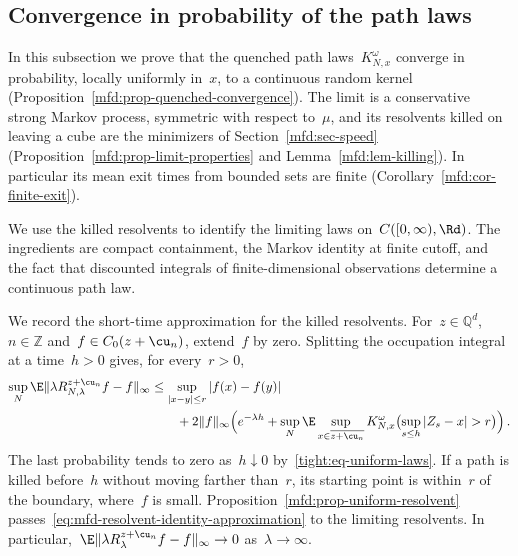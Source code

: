 \documentclass[11pt]{amsart}
\begin{document}
\subsection{Convergence in probability of the path laws}
\label{mfd:sec-paths}

In this subsection we prove that the quenched path laws~$K^\omega_{N,x}$ converge in probability, locally uniformly in~$x$, to a continuous random kernel (Proposition~\ref{mfd:prop-quenched-convergence}). The limit is a conservative strong Markov process, symmetric with respect to~$\mu$, and its resolvents killed on leaving a cube are the minimizers of Section~\ref{mfd:sec-speed} (Proposition~\ref{mfd:prop-limit-properties} and Lemma~\ref{mfd:lem-killing}). In particular its mean exit times from bounded sets are finite (Corollary~\ref{mfd:cor-finite-exit}).

\smallskip

We use the killed resolvents to identify the limiting laws on~$C([0,\infty),\Rd)$. The ingredients are compact containment, the Markov identity at finite cutoff, and the fact that discounted integrals of finite-dimensional observations determine a continuous path law.

\smallskip

We record the short-time approximation for the killed resolvents. For~$z\in\mathbb Q^d$,~$n\in\mathbb Z$ and~$f\in C_0(z+\cu_n)$, extend~$f$ by zero. Splitting the occupation integral at a time~$h>0$ gives, for every~$r>0$,
\begin{align}
	\sup_N\E\|\lambda R^{z+\cu_n}_{N,\lambda}f-f\|_\infty
	& \leq\sup_{|x-y|\leq r}|f(x)-f(y)|
	\notag \\ & \qquad
	+2\|f\|_\infty\Bigl(e^{-\lambda h} +\sup_N\E\sup_{x\in\overline{z+\cu_n}}K^\omega_{N,x}
	\bigl(\sup_{s\leq h}|Z_s-x|>r\bigr)\Bigr)\,.
	\label{eq:mfd-resolvent-identity-approximation}
\end{align}
The last probability tends to zero as~$h\downarrow0$ by~\eqref{tight:eq-uniform-laws}. If a path is killed before~$h$ without moving farther than~$r$, its starting point is within~$r$ of the boundary, where~$f$ is small. Proposition~\ref{mfd:prop-uniform-resolvent} passes~\eqref{eq:mfd-resolvent-identity-approximation} to the limiting resolvents. In particular,~$\E\|\lambda R^{z+\cu_n}_\lambda f-f\|_\infty\to0$ as~$\lambda\to\infty$.
\end{document}
